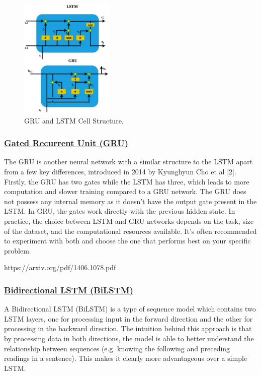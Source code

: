 \documentclass[conference]{IEEEtran}
\begin{document}
\begin{figure}[htbp]
  \centering
  \includegraphics[width=0.4\textwidth]{GRU+LSTM.eps}
  \caption{GRU and LSTM Cell Structure.}
  \label{fig:figure2}
\end{figure}

\subsubsection{\textbf{\ul{Gated Recurrent Unit (GRU)}}}
The GRU is another neural network with a similar structure to the LSTM apart from a few key differences, introduced in 2014 by Kyunghyun Cho et al [2]. Firstly, the GRU has two gates while the LSTM has three, which leads to more computation and slower training compared to a GRU network. The GRU does not possess any internal memory as it doesn’t have the output gate present in the LSTM. In GRU, the gates work directly with the previous hidden state. In practice, the choice between LSTM and GRU networks depends on the task, size of the dataset, and the computational resources available. It’s often recommended to experiment with both and choose the one that performs best on your specific problem.

https://arxiv.org/pdf/1406.1078.pdf

\subsubsection{\textbf{\ul{Bidirectional LSTM (BiLSTM)}}}
A Bidirectional LSTM (BiLSTM) is a type of sequence model which contains two LSTM layers, one for processing input in the forward direction and the other for processing in the backward direction. The intuition behind this approach is that by processing data in both directions, the model is able to better understand the relationship between sequences (e.g. knowing the following and preceding readings in a sentence). This makes it clearly more advantageous over a simple LSTM.
\end{document}
